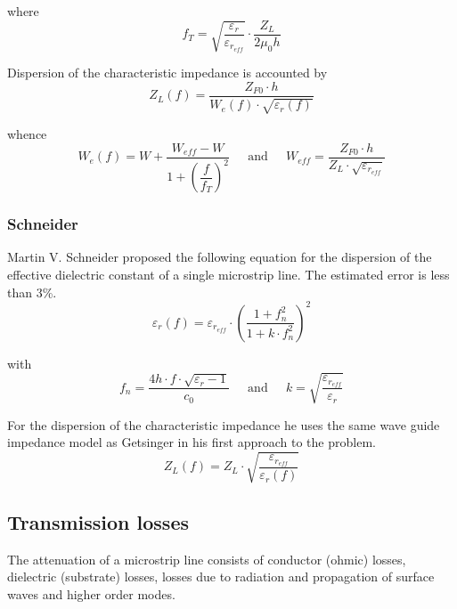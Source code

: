 where
\begin{equation}
f_T = \sqrt{\dfrac{\varepsilon_{r}}{\varepsilon_{r_{eff}}}}\cdot \dfrac{Z_L}{2\mu_0 h}
\end{equation}

Dispersion of the characteristic impedance is accounted by
\begin{equation}
Z_L(f) = \dfrac{Z_{F0}\cdot h}{W_e(f)\cdot \sqrt{\varepsilon_r(f)}}
\end{equation}

whence
\begin{equation}
W_e(f) = W + \dfrac{W_{eff} - W}{1 + \left(\dfrac{f}{f_T}\right)^2}
\;\;\;\; \textrm{ and } \;\;\;\;
W_{eff} = \dfrac{Z_{F0}\cdot h}{Z_L\cdot \sqrt{\varepsilon_{r_{eff}}}}
\end{equation}

\subsubsection{Schneider}

Martin V. Schneider \cite{Schneider1} proposed the following equation
for the dispersion of the effective dielectric constant of a single
microstrip line.  The estimated error is less than 3\%.
\begin{equation}
\varepsilon_r(f) = \varepsilon_{r_{eff}}\cdot \left(\dfrac{1 + f_n^2}{1 + k\cdot f_n^2}\right)^2
\end{equation}

with
\begin{equation}
f_n = \dfrac{4 h \cdot f \cdot \sqrt{\varepsilon_r - 1}}{c_0}
\;\;\;\; \textrm{ and } \;\;\;\;
k = \sqrt{\dfrac{\varepsilon_{r_{eff}}}{\varepsilon_r}}
\end{equation}

For the dispersion of the characteristic impedance he uses the same
wave guide impedance model as Getsinger in his first approach to the
problem.
\begin{equation}
Z_L(f) = Z_L\cdot \sqrt{\dfrac{\varepsilon_{r_{eff}}}{\varepsilon_r(f)}}
\end{equation}

\subsection{Transmission losses}

The attenuation of a microstrip line consists of conductor (ohmic)
losses, dielectric (substrate) losses, losses due to radiation and
propagation of surface waves and higher order modes.

